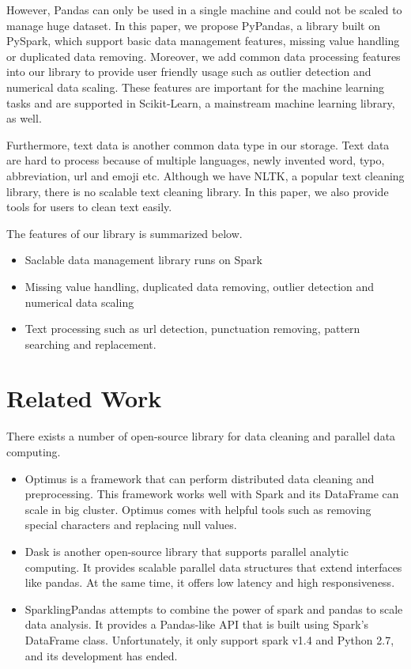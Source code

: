 \documentclass[sigconf]{acmart}
\begin{document}
However, Pandas can only be used in a single machine and could not be scaled to manage huge dataset. In this paper, we propose PyPandas, a library built on PySpark, which support basic data management features, missing value handling or duplicated data removing. Moreover, we add common data processing features into our library to provide user friendly usage such as outlier detection and numerical data scaling. These features are important for the machine learning tasks and are supported in Scikit-Learn\cite{scikit-learn}, a mainstream machine learning library, as well.
	
Furthermore, text data is another common data type in our storage. Text data are hard to process because of multiple languages, newly invented word, typo, abbreviation, url and emoji etc. Although we have NLTK\cite{nltk}, a popular text cleaning library, there is no scalable text cleaning library. In this paper, we also provide tools for users to clean text easily. 
	
The features of our library is summarized below.
\begin{itemize}
	\item{Saclable data management library runs on Spark}
	\item{Missing value handling, duplicated data removing, outlier detection and numerical data scaling}
	\item{Text processing such as url detection, punctuation removing, pattern searching and replacement. }
\end{itemize}	

\section{Related Work}
There exists a number of open-source library for data cleaning and parallel data computing. 
\begin{itemize}
	\item{Optimus}\cite{optimus} is a framework that can perform distributed data cleaning and preprocessing. This framework works well with Spark and its DataFrame can scale in big cluster. Optimus comes with helpful tools such as removing special characters and replacing null values.
	\item{Dask}\cite{dask} is another open-source library that supports parallel analytic computing. It provides scalable parallel data structures that extend interfaces like pandas. At the same time, it offers low latency and high responsiveness.
	\item{SparklingPandas}\cite{sparklingpandas} attempts to combine the power of spark and pandas to scale data analysis. It provides a Pandas-like API that is built using Spark's DataFrame class. Unfortunately, it only support spark v1.4 and Python 2.7, and its development has ended.
\end{itemize}
\end{document}
